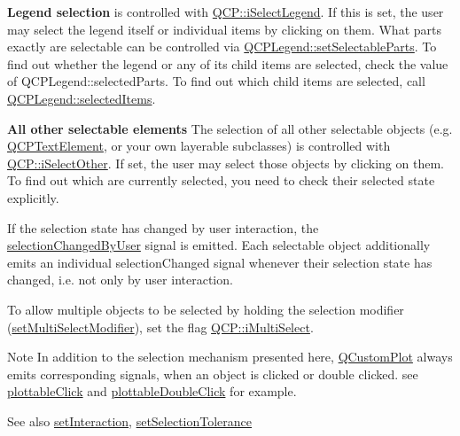 {\bfseries Legend selection} is controlled with \mbox{\hyperlink{namespace_q_c_p_a2ad6bb6281c7c2d593d4277b44c2b037a269c9af298e257d1108edec0432b5513}{Q\+C\+P\+::i\+Select\+Legend}}. If this is set, the user may select the legend itself or individual items by clicking on them. What parts exactly are selectable can be controlled via \mbox{\hyperlink{class_q_c_p_legend_a9ce60aa8bbd89f62ae4fa83ac6c60110}{Q\+C\+P\+Legend\+::set\+Selectable\+Parts}}. To find out whether the legend or any of its child items are selected, check the value of Q\+C\+P\+Legend\+::selected\+Parts. To find out which child items are selected, call \mbox{\hyperlink{class_q_c_p_legend_ac7d9e567d5c551e09cd9bcc4306c5532}{Q\+C\+P\+Legend\+::selected\+Items}}.

{\bfseries All other selectable elements} The selection of all other selectable objects (e.\+g. \mbox{\hyperlink{class_q_c_p_text_element}{Q\+C\+P\+Text\+Element}}, or your own layerable subclasses) is controlled with \mbox{\hyperlink{namespace_q_c_p_a2ad6bb6281c7c2d593d4277b44c2b037af67a50bc26147a13b551b3a625374949}{Q\+C\+P\+::i\+Select\+Other}}. If set, the user may select those objects by clicking on them. To find out which are currently selected, you need to check their selected state explicitly.

If the selection state has changed by user interaction, the \mbox{\hyperlink{class_q_custom_plot_a500c64a109bc773c973ad274f2fa4190}{selection\+Changed\+By\+User}} signal is emitted. Each selectable object additionally emits an individual selection\+Changed signal whenever their selection state has changed, i.\+e. not only by user interaction.

To allow multiple objects to be selected by holding the selection modifier (\mbox{\hyperlink{class_q_custom_plot_a8fc96e3b5138a06759a2a90c166df516}{set\+Multi\+Select\+Modifier}}), set the flag \mbox{\hyperlink{namespace_q_c_p_a2ad6bb6281c7c2d593d4277b44c2b037aef673112c5067c3cf4cfddb62da7265d}{Q\+C\+P\+::i\+Multi\+Select}}.

\begin{DoxyNote}{Note}
In addition to the selection mechanism presented here, \mbox{\hyperlink{class_q_custom_plot}{Q\+Custom\+Plot}} always emits corresponding signals, when an object is clicked or double clicked. see \mbox{\hyperlink{class_q_custom_plot_af5fe78b8bc9e4e96df921612837fd4fd}{plottable\+Click}} and \mbox{\hyperlink{class_q_custom_plot_a86a3ab7263c9c4e008e70d6c5fce9fbd}{plottable\+Double\+Click}} for example.
\end{DoxyNote}
\begin{DoxySeeAlso}{See also}
\mbox{\hyperlink{class_q_custom_plot_a422bf1bc6d56dac75a3d805d9a65902c}{set\+Interaction}}, \mbox{\hyperlink{class_q_custom_plot_a4dc31241d7b09680950e19e5f971ed93}{set\+Selection\+Tolerance}} 
\end{DoxySeeAlso}
\mbox{\label{class_q_custom_plot_a8fc96e3b5138a06759a2a90c166df516}} 
